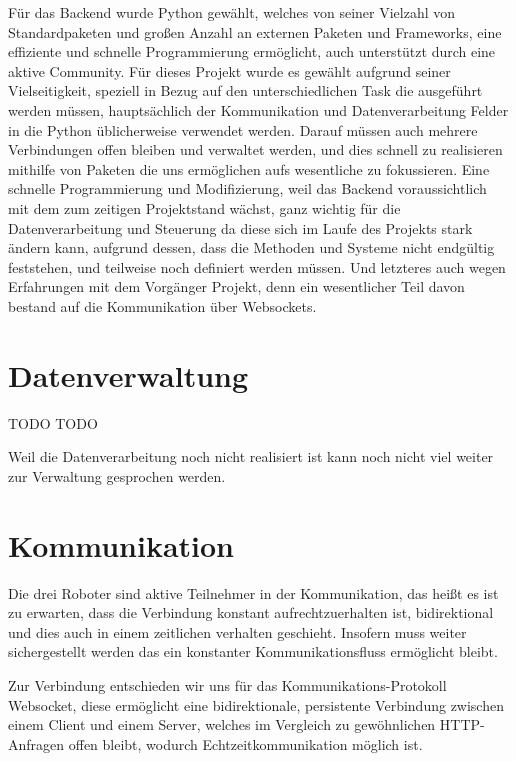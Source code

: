 Für das Backend wurde Python gewählt, 
welches von seiner Vielzahl von Standardpaketen und 
großen Anzahl an externen Paketen und Frameworks, 
eine effiziente und schnelle Programmierung ermöglicht, 
auch unterstützt durch eine aktive Community.
% 
Für dieses Projekt wurde es gewählt aufgrund seiner Vielseitigkeit, 
speziell in Bezug auf den unterschiedlichen Task die ausgeführt werden müssen, 
hauptsächlich der Kommunikation und Datenverarbeitung 
Felder in die Python üblicherweise verwendet werden.
% 
Darauf müssen auch mehrere Verbindungen offen bleiben und verwaltet werden,
und dies schnell zu realisieren mithilfe von Paketen 
die uns ermöglichen aufs wesentliche zu fokussieren.
% 
Eine schnelle Programmierung und Modifizierung, 
weil das Backend voraussichtlich mit dem zum zeitigen Projektstand wächst, 
ganz wichtig für die Datenverarbeitung und Steuerung da diese sich im Laufe des Projekts stark ändern kann,
aufgrund dessen, dass die Methoden und Systeme nicht endgültig feststehen, 
und teilweise noch definiert werden müssen.
% 
Und letzteres auch wegen Erfahrungen mit dem Vorgänger Projekt, 
denn ein wesentlicher Teil davon bestand auf die Kommunikation über Websockets.

\section{Datenverwaltung}
\label{subsec:backend_data}
TODO
TODO

Weil die Datenverarbeitung noch nicht realisiert ist 
kann noch nicht viel weiter zur Verwaltung gesprochen werden.

\section{Kommunikation}
\label{subsec:Kommunikation}
Die drei Roboter sind aktive Teilnehmer in der Kommunikation, 
das heißt es ist zu erwarten, dass die Verbindung konstant aufrechtzuerhalten ist,
bidirektional und dies auch in einem zeitlichen verhalten geschieht. 
Insofern muss weiter sichergestellt werden das ein konstanter Kommunikationsfluss ermöglicht bleibt.

Zur Verbindung entschieden wir uns für das Kommunikations-Protokoll Websocket, 
diese ermöglicht eine bidirektionale, persistente Verbindung zwischen einem Client und einem Server,
welches im Vergleich zu gewöhnlichen HTTP-Anfragen offen bleibt, wodurch Echtzeitkommunikation möglich ist.

